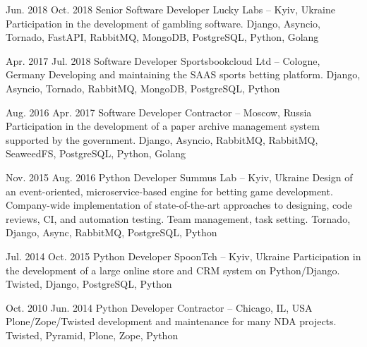 \documentclass[a4paper]{mcresume}
\begin{document}
{\begin{twenty}
    \workitem
    {Jun. 2018}
    {Oct. 2018}
    {Senior Software Developer}
    {Lucky Labs -- Kyiv, Ukraine}
    {\onsite}
    {Participation in the development of gambling software.}
    {Django, Asyncio, Tornado, FastAPI, RabbitMQ, MongoDB, PostgreSQL, Python, Golang}

    \workitem
    {Apr. 2017}
    {Jul. 2018}
    {Software Developer}
    {Sportsbookcloud Ltd -- Cologne, Germany}
    {\remote}
    {Developing and maintaining the SAAS sports betting platform.}
    {Django, Asyncio, Tornado, RabbitMQ, MongoDB, PostgreSQL, Python}

    \workitem
    {Aug. 2016}
    {Apr. 2017}
    {Software Developer}
    {Contractor -- Moscow, Russia}
    {\remote}
    {Participation in the development of a paper archive management system supported by the government.}
    {Django, Asyncio, RabbitMQ, RabbitMQ, SeaweedFS, PostgreSQL, Python, Golang}

    \workitem
    {Nov. 2015}
    {Aug. 2016}
    {Python Developer}
    {Summus Lab -- Kyiv, Ukraine}
    {\onsite}
    {Design of an event-oriented, microservice-based engine for betting game development.
    Company-wide implementation of state-of-the-art approaches to designing, code reviews, CI, and automation testing.
    Team management, task setting.}
    {Tornado, Django, Async, RabbitMQ, PostgreSQL, Python}
    {\small}

    \workitem
    {Jul. 2014}
    {Oct. 2015}
    {Python Developer}
    {SpoonTch -- Kyiv, Ukraine}
    {\remote}
    {Participation in the development of a large online store and CRM system on Python/Django.}
    {Twisted, Django, PostgreSQL, Python}
    {\small}


    \workitem
    {Oct. 2010}
    {Jun. 2014}
    {Python Developer}
    {Contractor -- Chicago, IL, USA}
    {\remote}
    {Plone/Zope/Twisted development and maintenance for many NDA projects.}
    {Twisted, Pyramid, Plone, Zope, Python}

    \end{twenty}

}
\end{document}
